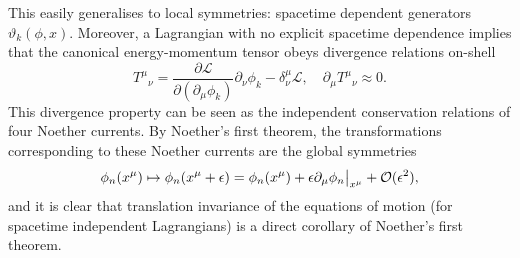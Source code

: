 \documentclass[11pt, a4paper]{article}
\begin{document}
This easily generalises to local symmetries: spacetime dependent generators
$\vartheta_k(\phi, x)$. Moreover, a Lagrangian with no
explicit spacetime dependence implies that the canonical energy-momentum
tensor obeys divergence relations on-shell 
\begin{equation}
  {T^\mu}_\nu = \frac{\partial \mathcal{L}}{\partial(\partial_\mu{\phi_k})} 
  \partial_\nu\phi_k -\delta^\mu_\nu\mathcal{L},
  \quad \partial_\mu {T^\mu}_\nu \approx 0.
\end{equation}
This divergence property can be seen as the independent conservation relations of
four Noether currents. By Noether's first theorem, the transformations corresponding to
these Noether currents are the global symmetries
\begin{equation}
  \phi_n(x^\mu) \mapsto \phi_n(x^\mu + \epsilon) = \phi_n(x^\mu)
  + \epsilon\partial_\mu\phi_n\big{|}_{x^\mu} + \mathcal{O}(\epsilon^2), 
\end{equation}
and it is clear that translation invariance of the equations of motion (for spacetime independent 
Lagrangians) is a direct corollary of Noether's first theorem.
\end{document}
